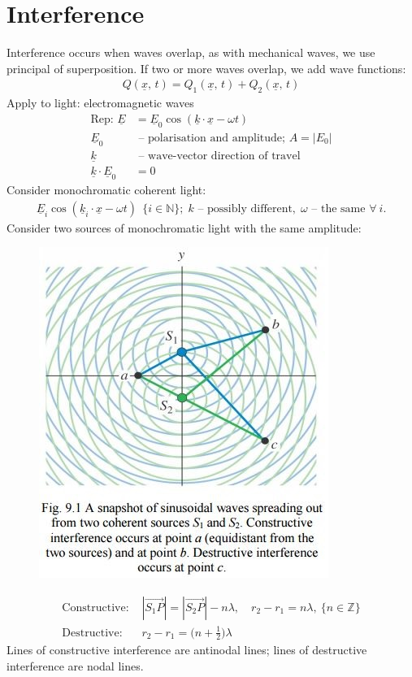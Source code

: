 \documentclass[a4paper, 11pt, normalem]{report}
\begin{document}
\section{Interference}
Interference occurs when waves overlap, as with mechanical waves, we use principal of superposition.
If two or more waves overlap, we add wave functions:
\begin{align}
    Q(\underline{x},\,t) = Q_{1}(\underline{x},\,t) + Q_{2}(\underline{x},\,t)
\end{align}
Apply to light: electromagnetic waves
\begin{align}
    \text{Rep: }\underline{E} &= \underline{E}_{0}\cos{(\underline{k}\cdot\underline{x} - \omega t)} \\
    \underline{E}_{0}&\text{ -- polarisation and amplitude; }A = |E_{0}| \\
    \underline{k}&\text{ -- wave-vector direction of travel} \\
    \underline{k}\cdot\underline{E}_{0} &= 0
\end{align}
Consider monochromatic coherent light:
\begin{align}
    \underline{E}_{i}\cos{(\underline{k}_{i}\cdot\underline{x} - \omega t)}~~\{i \in \mathbb{N}\};\; k\text{ -- possibly different},\; \omega\text{ -- the same }\forall ~i.
\end{align}
Consider two sources of monochromatic light with the same amplitude:
\begin{figure}[H]
    \centering
    \includegraphics{Construc.jpg}
\end{figure}
\begin{align}
    \text{Constructive: }&|\overrightarrow{S_{1}P}| = |\overrightarrow{S_{2}P}| - n\lambda,\quad r_{2} - r_{1} = n\lambda, ~\{n \in \mathbb{Z}\} \\
    \text{Destructive: }&r_{2} - r_{1} = \Big(n + \frac{1}{2}\Big)\lambda
\end{align}
Lines of constructive interference are antinodal lines; lines of destructive interference are nodal lines.
\end{document}

